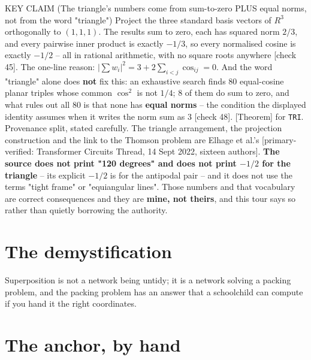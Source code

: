 \begin{whybox}{KEY CLAIM (The triangle's numbers come from sum-to-zero PLUS equal norms, not from the word "triangle")}
Project the three standard basis vectors of $R^3$ orthogonally to $(1,1,1)$. The results sum to zero, each has squared norm $2/3$, and every pairwise inner product is exactly $-1/3$, so every normalised cosine is exactly $-1/2$ -- all in rational arithmetic, with no square roots anywhere [check 45]. The one-line reason: $|\sum w_i|^2 = 3 + 2\sum_{i<j}\cos_{ij} = 0$. And the word "triangle" alone does \textbf{not} fix this: an exhaustive search finds 80 equal-cosine planar triples whose common $\cos^2$ is not $1/4$; 8 of them do sum to zero, and what rules out all 80 is that none has \textbf{equal norms} -- the condition the displayed identity assumes when it writes the norm sum as $3$ [check 48]. [Theorem] for \texttt{TRI}.
Provenance split, stated carefully. The triangle arrangement, the projection construction and the link to the Thomson problem are Elhage et al.'s [primary-verified: Transformer Circuits Thread, 14 Sept 2022, sixteen authors]. \textbf{The source does not print "120 degrees" and does not print $-1/2$ for the triangle} -- its explicit $-1/2$ is for the antipodal pair -- and it does not use the terms "tight frame" or "equiangular lines". Those numbers and that vocabulary are correct consequences and they are \textbf{mine, not theirs}, and this tour says so rather than quietly borrowing the authority.
\end{whybox}

\section*{The demystification}

\begin{whyboxnt}
Superposition is not a network being untidy; it is a network solving a packing problem, and the packing problem has an answer that a schoolchild can compute if you hand it the right coordinates.
\end{whyboxnt}

\section*{The anchor, by hand}

